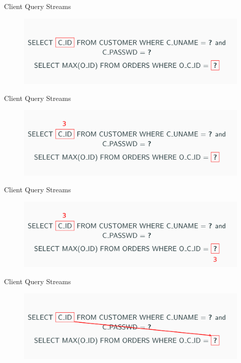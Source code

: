 \documentclass[12pt]{beamer}
\begin{document}
\begin{frame}[fragile]{Client Query Streams}
    \begin{figure}
        \includegraphics[scale=0.25]{apollo_parameter_mappings}
    \end{figure}
\end{frame}

\begin{frame}[fragile]{Client Query Streams}
    \begin{figure}
        \includegraphics[scale=0.25]{apollo_parameter_mappings_2}
    \end{figure}
\end{frame}

\begin{frame}[fragile]{Client Query Streams}
    \begin{figure}
        \includegraphics[scale=0.25]{apollo_parameter_mappings_3}
    \end{figure}
\end{frame}

\begin{frame}[fragile]{Client Query Streams}
    \begin{figure}
        \includegraphics[scale=0.25]{apollo_parameter_mappings_4}
    \end{figure}
\end{frame}
\end{document}
